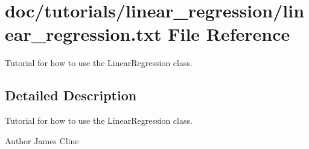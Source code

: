 \section{doc/tutorials/linear\+\_\+regression/linear\+\_\+regression.txt File Reference}
\label{linear__regression_8txt}


Tutorial for how to use the Linear\+Regression class.  




\subsection{Detailed Description}
Tutorial for how to use the Linear\+Regression class. 

\begin{DoxyAuthor}{Author}
James Cline 
\end{DoxyAuthor}
